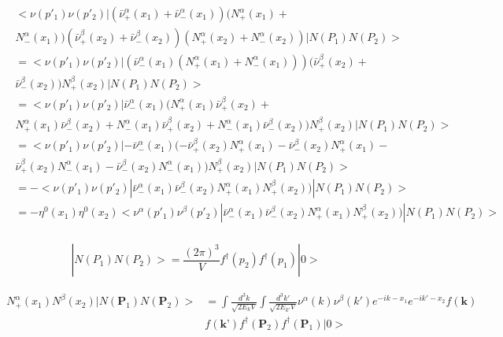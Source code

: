 \begin{gather}
\begin{split}
&<\nu(p'_{1})\nu(p'_{2})|(\bar{\nu}^{\alpha}_{+}(x_1)+\bar{\nu}^{\alpha}_{-}(x_1))({N}^{\alpha}_{+}(x_1)+\\&{N}^{\alpha}_{-}(x_1))(\bar{\nu}^{\beta}_{+}(x_2)+\bar{\nu}^{\beta}_{-}(x_2))(N^{\alpha}_{+}(x_2)+N^{\alpha}_{-}(x_2))|N(P_1)N(P_2)>\\
&=<\nu(p'_{1})\nu(p'_{2})|(\bar{\nu}^{\alpha}_{-}(x_1)({N}^{\alpha}_{+}(x_1)+{N}^{\alpha}_{-}(x_1)))(\bar{\nu}^{\beta}_{+}(x_2)+\\&\bar{\nu}^{\beta}_{-}(x_2)){N}^{\beta}_+(x_2)|N(P_1)N(P_2)>\\
&=<\nu(p'_{1})\nu(p'_{2})|\bar{\nu}^{\alpha}_{-}(x_1)({N}^{\alpha}_{+}(x_1)\bar{\nu}^{\beta}_{+}(x_2)+\\&{N}^{\alpha}_{+}(x_1)\bar{\nu}^{\beta}_{-}(x_2)+{N}^{\alpha}_{-}(x_1)\bar{\nu}^{\beta}_{+}(x_2)+{N}^{\alpha}_{-}(x_1)\bar{\nu}^{\beta}_{-}(x_2)){N}^{\beta}_{+}(x_2)|N(P_1)N(P_2)>\\
&=<\nu(p'_{1})\nu(p'_{2})|-\bar{\nu}^{\alpha}_{-}(x_1)(-\bar{\nu}^{\beta}_{+}(x_2){N}^{\alpha}_{+}(x_1)-\bar{\nu}^{\beta}_{-}(x_2){N}^{\alpha}_{+}(x_1)-\\&\bar{\nu}^{\beta}_{+}(x_2){N}^{\alpha}_{-}(x_1)-\bar{\nu}^{\beta}_{-}(x_2){N}^{\alpha}_{-}(x_1)){N}^{\beta}_{+}(x_2)|N(P_1)N(P_2)>\\
&=-<\nu(p'_{1})\nu(p'_{2})|\bar{\nu}^{\alpha}_{-}(x_1)\bar{\nu}^{\beta}_{-}(x_2){N}^{\alpha}_{+}(x_1){N}^{\beta}_{+}(x_2))|N(P_1)N(P_2)>\\
&=-\eta^{0}(x_1)\eta^{0}(x_2)<{\nu}^{\alpha}(p'_{1}){\nu}^{\beta}(p'_{2})|\bar{\nu}^{\alpha}_{-}(x_{1})\bar{\nu}^{\beta}_{-}(x_{2}){N}^{\alpha}_{+}(x_1){N}^{\beta}_{+}(x_2))|N(P_1)N(P_2)>\\
\end{split}
\end{gather}

\begin {equation}
|N(P_1)N(P_2)>=\frac{(2\pi)^{3}}{V}f^{\dagger}(p_2)f^{\dagger}(p_1)|0>
\end{equation}

\begin{gather}
\begin{split}
{N}^{\alpha}_{+}(x_1){N}^{\beta}(x_2)|N(\textbf{P}_1)N(\textbf{P}_2)>&= \int \frac{{d}^{3}k}{\sqrt{2E_{k}V}}\int \frac{{d}^{3}k'}{\sqrt{2E_{k'}V}}\nu^{\alpha}(k)\nu^{\beta}(k')e^{-ik-x_{1}}e^{-ik'-x_{2}}f(\textbf{k})\\&f(\textbf{k'})f^{\dagger}(\textbf{P}_2)f^{\dagger}(\textbf{P}_1)|0>
\end{split}
\end{gather}

